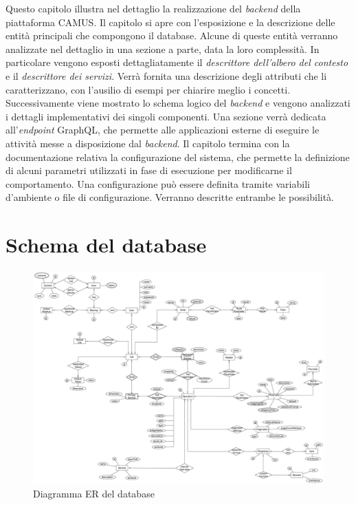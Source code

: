 Questo capitolo illustra nel dettaglio la realizzazione del \emph{backend} della piattaforma CAMUS. Il capitolo si apre con l'esposizione e la descrizione delle entità principali che compongono il database. Alcune di queste entità verranno analizzate nel dettaglio in una sezione a parte, data la loro complessità. In particolare vengono esposti dettagliatamente il \emph{descrittore dell'albero del contesto} e il \emph{descrittore dei servizi}. Verrà fornita una descrizione degli attributi che li caratterizzano, con l'ausilio di esempi per chiarire meglio i concetti. Successivamente viene mostrato lo schema logico del \emph{backend} e vengono analizzati i dettagli implementativi dei singoli componenti. Una sezione verrà dedicata all'\emph{endpoint} GraphQL, che permette alle applicazioni esterne di eseguire le attività messe a disposizione dal \emph{backend}. Il capitolo termina con la documentazione relativa la configurazione del sistema, che permette la definizione di alcuni parametri utilizzati in fase di esecuzione per modificarne il comportamento. Una configurazione può essere definita tramite variabili d'ambiente o file di configurazione. Verranno descritte entrambe le possibilità.

\section{Schema del database\label{sec:schema-database}}

\begin{figure}[p]
	\centering
	\includegraphics[height=\textwidth, angle=90]{5-implementazione-backend/Immagini/schema_er_db.pdf}
	\caption{Diagramma ER del database}\label{fig:schema-er-db}
\end{figure}

